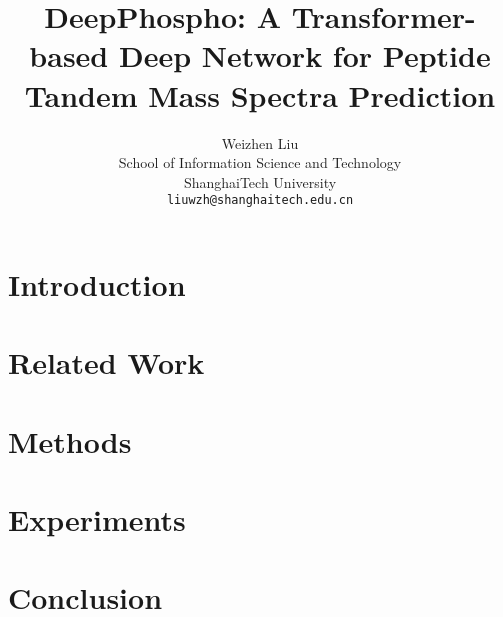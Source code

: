 \documentclass[final]{cvpr}
\begin{document}
\title{DeepPhospho: A Transformer-based Deep Network for Peptide \\Tandem Mass Spectra Prediction}

\author{Weizhen Liu\\
School of Information Science and Technology\\
ShanghaiTech University\\
{\tt\small liuwzh@shanghaitech.edu.cn}}


\maketitle





\section{Introduction}


\section{Related Work}


\section{Methods}


\section{Experiments}


\section{Conclusion}



{\small


}
\end{document}
